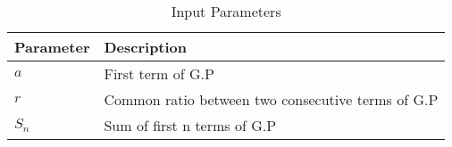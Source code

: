 \begin{table}[htbp]
\centering
\caption{Input Parameters}
\begin{tabular}{|p{1.5cm}|p{4cm}|}
\hline
\textbf{Parameter} & \textbf{Description} \\
\hline
$a$ &  First term of G.P \\
\hline
$r$ & Common ratio between two consecutive terms of G.P \\
\hline
$S_n$ & Sum of first n terms of G.P\\
\hline

\end{tabular}

\end{table}